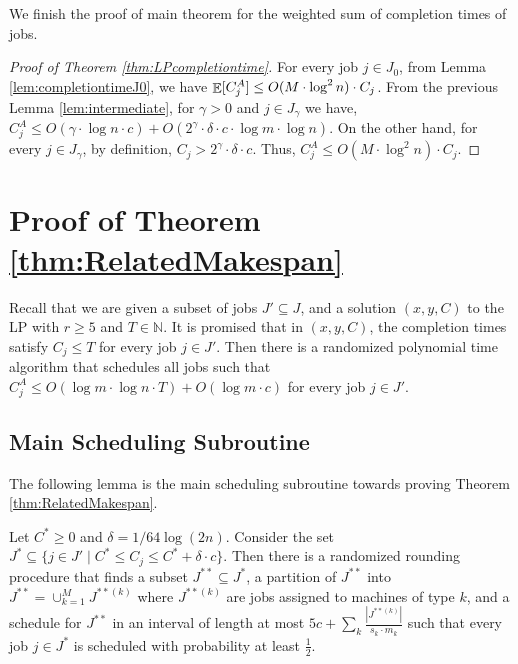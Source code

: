   We finish the proof of main theorem for the weighted sum of completion times of jobs.
  
  \begin{proof} [Proof of Theorem \ref{thm:LPcompletiontime}]
  For every job $j \in J_0$, from Lemma \ref{lem:completiontimeJ0},  we have $\mathop{\mathbb{E}}[C^A_j] \leq O(M \cdot \log^2 n) \cdot C_j$.
  From the previous Lemma \ref{lem:intermediate}, for $\gamma  > 0$ and $j \in J_{\gamma }$ we have, $C^A_j \leq O(\gamma \cdot \log n \cdot c) + O(2^{\gamma } \cdot \delta \cdot c \cdot \log m \cdot \log n )$.
  On the other hand,  for every $j \in J_{\gamma}$, by definition, $C_j >  2^{\gamma} \cdot \delta \cdot c$.
  Thus, $C^A_j \leq  O(M \cdot \log^2 n) \cdot C_j$.
  \end{proof}
  
  
  
  \section{Proof of Theorem \ref{thm:RelatedMakespan}}
  \label{sec:makespan}
  
  Recall that we are given a subset of jobs $J' \subseteq J$, and a solution $(x,y,C)$ to the LP with $r \geq 5$ and  $T \in \mathbb{N}$.
  It is promised that in  $(x,y,C)$, the completion times satisfy $C_j \leq T$ for every job $j \in J'$.
  Then there is a randomized polynomial time algorithm that schedules all jobs such that $C_j^A \leq O(\log m  \cdot \log n  \cdot T) + O(\log m \cdot c)$ for every job $j \in J'$. 
  
  \subsection{Main Scheduling Subroutine}
  \label{subsec:singlebatchrelated}
  
  The following lemma is the main scheduling subroutine towards proving Theorem \ref{thm:RelatedMakespan}. 
  
  \begin{lemma} \label{lem:RSchedulingOneIntervalViaCKR}
  Let $C^* \geq 0$ and $\delta = 1/64\log(2n)$. 
  Consider the set $J^* \subseteq \{ j \in J' \mid C^* \leq C_j \leq C^*+\delta \cdot c \}$.
  Then there is a randomized rounding procedure that finds a subset $J^{**} \subseteq J^*$,
  a partition of $J^{**}$ into $J^{**} = \cup_{k=1}^{M} J^{**(k)}$ where $J^{**(k)}$ are jobs assigned to machines of type $k$,
  and a schedule for $J^{**}$ in an interval of length at most $5c+\sum_k \frac{|J^{**(k)}|}{s_k \cdot m_k}$ such that every job $j \in J^*$
  is scheduled with probability at least $\frac{1}{2}$.
  \end{lemma}
  
